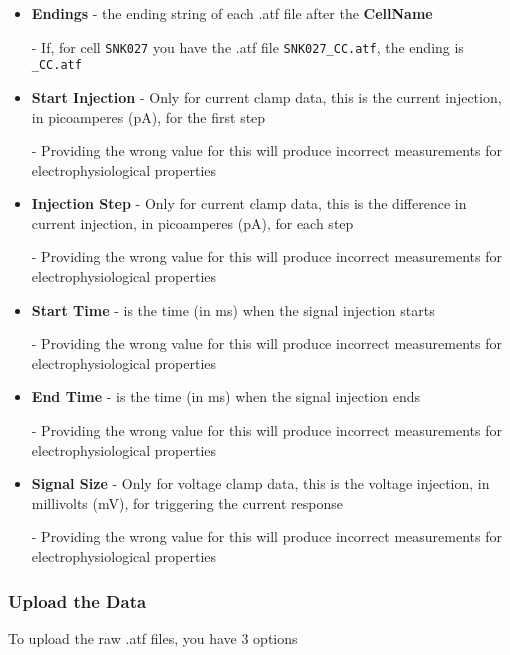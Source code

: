 \documentclass{article}
\begin{document}
\begin{itemize}
    \item \textbf{Endings} - the ending string of each .atf file after the \textbf{CellName}
    
    - If, for cell \verb|SNK027| you have the .atf file \verb|SNK027_CC.atf|, the ending is \verb|_CC.atf|
    
    \item \textbf{Start Injection} - Only for current clamp data, this is the current injection, in picoamperes (pA), for the first step
    
    - Providing the wrong value for this will produce incorrect measurements for electrophysiological properties
    
    \item \textbf{Injection Step} - Only for current clamp data, this is the difference in current injection, in picoamperes (pA), for each step
    
    - Providing the wrong value for this will produce incorrect measurements for electrophysiological properties
    
    \item \textbf{Start Time} - is the time (in ms) when the signal injection starts
    
    - Providing the wrong value for this will produce incorrect measurements for electrophysiological properties
    
    \item \textbf{End Time} - is the time (in ms) when the signal injection ends
    
    - Providing the wrong value for this will produce incorrect measurements for electrophysiological properties
    
    \item \textbf{Signal Size} - Only for voltage clamp data, this is the voltage injection, in millivolts (mV), for triggering the current response
    
    - Providing the wrong value for this will produce incorrect measurements for electrophysiological properties
\end{itemize}

\subsubsection{Upload the Data}

To upload the raw .atf files, you have 3 options
\end{document}
